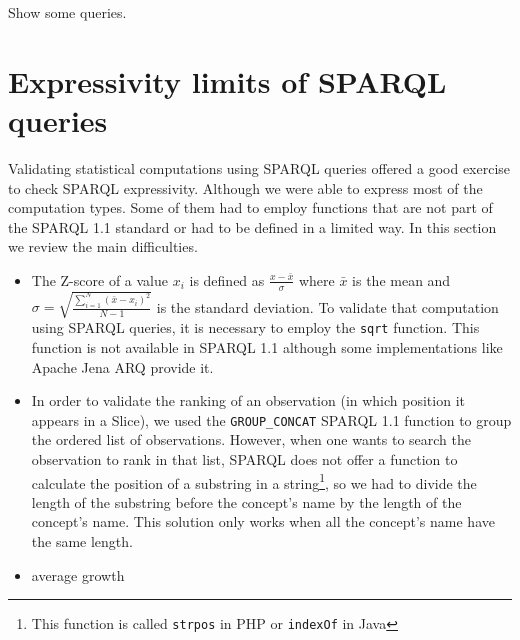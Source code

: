 Show some queries.

\section{Expressivity limits of SPARQL queries}

Validating statistical computations using SPARQL queries offered 
 a good exercise to check SPARQL expressivity. Although we were able 
 to express most of the computation types. 
Some of them had to employ functions that are not part of the SPARQL 1.1
standard or had to be defined in a limited way. In this section we review 
the main difficulties.

\begin{itemize} 

\item The Z-score of a value $x_i$ is defined as $\frac{x - \bar{x}}{\sigma}$
where $\bar{x}$ is the mean and $\sigma=\sqrt{\frac{\sum_{i=1}^{N}(\bar{x}-x_i)^2}{N -
1}}$ is the standard deviation. To validate that computation using SPARQL
queries, it is necessary to employ the \lstinline|sqrt| function. 
This function is not available in SPARQL 1.1 although some implementations 
 like Apache Jena ARQ provide it.

\item In order to validate the ranking of an observation (in which position it
appears in a Slice), we used the \lstinline|GROUP_CONCAT| SPARQL 1.1
function to group the ordered list of observations. However, when one
wants to search the observation to rank in that list, SPARQL 
 does not offer a function to calculate the position of a substring in a
 string\footnote{This function is called \lstinline|strpos|
 in PHP or \lstinline|indexOf| in Java}, so we had to divide the length of the
 substring before the concept's name by the length of the concept's
 name. This solution only works when all the concept's name have the same
 length.

\item average growth

\end{itemize}
